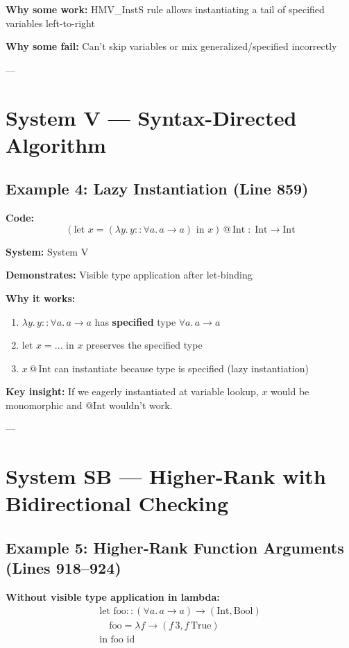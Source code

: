 \documentclass[11pt,a4paper]{article}
\begin{document}
\textbf{Why some work:} HMV\_InstS rule allows instantiating a tail of specified variables left-to-right

\textbf{Why some fail:} Can't skip variables or mix generalized/specified incorrectly

---

\section{System V --- Syntax-Directed Algorithm}

\subsection{Example 4: Lazy Instantiation (Line 859)}

\textbf{Code:}
\[
(\text{let } x = (\lambda y.\, y :: \forall a.\, a \to a) \text{ in } x) \,@\,\text{Int} \;:\; \text{Int} \to \text{Int}
\]

\textbf{System:} System V

\textbf{Demonstrates:} Visible type application after let-binding

\textbf{Why it works:}
\begin{enumerate}
\item $\lambda y.\, y :: \forall a.\, a \to a$ has \textbf{specified} type $\forall a.\, a \to a$
\item $\text{let } x = \ldots \text{ in } x$ preserves the specified type
\item $x \,@\,\text{Int}$ can instantiate because type is specified (lazy instantiation)
\end{enumerate}

\textbf{Key insight:} If we eagerly instantiated at variable lookup, $x$ would be monomorphic and $@\text{Int}$ wouldn't work.

---

\section{System SB --- Higher-Rank with Bidirectional Checking}

\subsection{Example 5: Higher-Rank Function Arguments (Lines 918--924)}

\textbf{Without visible type application in lambda:}
\[
\begin{array}{l}
\text{let foo} :: (\forall a.\, a \to a) \to (\text{Int}, \text{Bool}) \\
\quad \text{foo} = \lambda f \to (f\, 3, f\, \text{True}) \\
\text{in foo id}
\end{array}
\]
\end{document}
